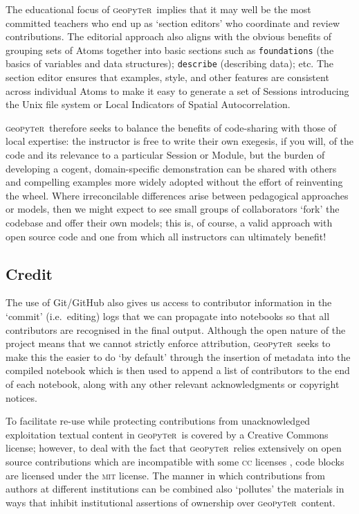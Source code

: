 \documentclass[letter, 11pt,titlepage]{article}
\newcommand{\gp}{\textsc{g}eo\textsc{p}y\textsc{t}e\textsc{r}~\/}
\newcommand{\ie}{i.e.~\/}
\begin{document}
The educational focus of \gp implies that it may well be the most committed teachers who end up as `section editors' who coordinate and review contributions. The editorial approach also aligns with the obvious benefits of grouping sets of Atoms together into basic sections such as \texttt{foundations} (the basics of variables and data structures); \texttt{describe} (describing data); etc. The section editor ensures that examples, style, and other features are consistent across individual Atoms to make it easy to generate a set of Sessions introducing the Unix file system or Local Indicators of Spatial Autocorrelation.

\gp therefore seeks to balance the benefits of code-sharing with those of local expertise: the instructor is free to write their own exegesis, if you will, of the code and its relevance to a particular Session or Module, but the burden of developing a cogent, domain-specific demonstration can be shared with others and compelling examples more widely adopted without the effort of reinventing the wheel. Where irreconcilable differences arise between pedagogical approaches or models, then we might expect to see small groups of collaborators `fork' the codebase and offer their own models; this is, of course, a valid approach with open source code and one from which all instructors can ultimately benefit!

\subsection{Credit}

The use of Git/GitHub also gives us access to contributor information in the `commit' (\ie editing) logs that we can propagate into notebooks so that all contributors are recognised in the final output. Although the open nature of the project means that we cannot strictly enforce attribution, \gp seeks to make this the easier to do `by default' through the insertion of metadata into the compiled notebook which is then used to append a list of contributors to the end of each notebook, along with any other relevant acknowledgments or copyright notices.

To facilitate re-use while protecting contributions from unacknowledged exploitation textual content in \gp is covered by a Creative Commons license; however, to deal with the fact that \gp relies extensively on open source contributions which are incompatible with some \textsc{cc} licenses \citep[see discussion in][]{osswatch2013}, code blocks are licensed under the \textsc{mit} license. The manner in which contributions from authors at different institutions can be combined also `pollutes' the materials in ways that inhibit institutional assertions of ownership over \gp content.
\end{document}
